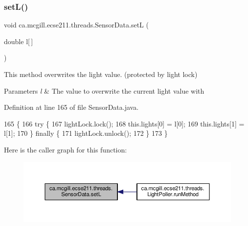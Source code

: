 \subsubsection{\texorpdfstring{set\+L()}{setL()}}
{\footnotesize\ttfamily void ca.\+mcgill.\+ecse211.\+threads.\+Sensor\+Data.\+setL (\begin{DoxyParamCaption}\item[{double}]{l\mbox{[}$\,$\mbox{]} }\end{DoxyParamCaption})}

This method overwrites the light value. (protected by light lock)


\begin{DoxyParams}{Parameters}
{\em l} & The value to overwrite the current light value with \\
\hline
\end{DoxyParams}


Definition at line 165 of file Sensor\+Data.\+java.


\begin{DoxyCode}
165                                \{
166     \textcolor{keywordflow}{try} \{
167       lightLock.lock();
168       this.lights[0] = l[0];
169       this.lights[1] = l[1];
170     \} \textcolor{keywordflow}{finally} \{
171       lightLock.unlock();
172     \}
173   \}
\end{DoxyCode}
Here is the caller graph for this function\+:
\nopagebreak
\begin{figure}[H]
\begin{center}
\leavevmode
\includegraphics[width=350pt]{classca_1_1mcgill_1_1ecse211_1_1threads_1_1_sensor_data_af905a6f2825716ae1a39bf7f6be09477_icgraph}
\end{center}
\end{figure}
\mbox{\label{classca_1_1mcgill_1_1ecse211_1_1threads_1_1_sensor_data_a6ad23111ecd378099f0b4ed0b6d398bc}} 
